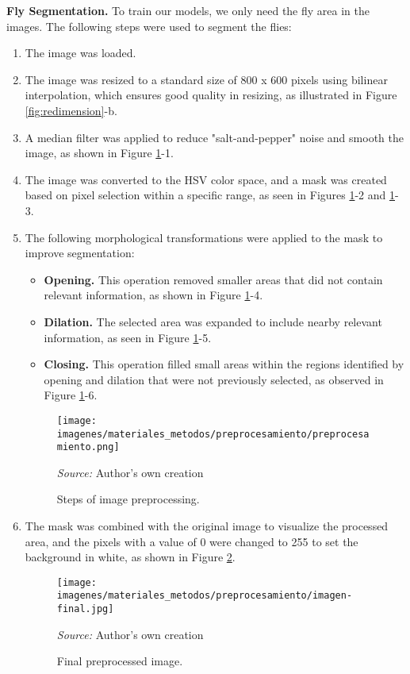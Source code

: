 \textbf{Fly Segmentation.}
To train our models, we only need the fly area in the images. The following steps were used to segment the flies:
\begin{enumerate}
	\item The image was loaded.
	\item The image was resized to a standard size of 800 x 600 pixels using bilinear interpolation, which ensures good quality in resizing, as illustrated in Figure \ref{fig:redimension}-b.
	\item A median filter was applied to reduce "salt-and-pepper" noise and smooth the image, as shown in Figure \ref{fig:preprocesamiento}-1.
	\item The image was converted to the HSV color space, and a mask was created based on pixel selection within a specific range, as seen in Figures \ref{fig:preprocesamiento}-2 and \ref{fig:preprocesamiento}-3.
	\item The following morphological transformations were applied to the mask to improve segmentation:
	\begin{itemize}
		\item \textbf{Opening.} This operation removed smaller areas that did not contain relevant information, as shown in Figure \ref{fig:preprocesamiento}-4.
		\item \textbf{Dilation.} The selected area was expanded to include nearby relevant information, as seen in Figure \ref{fig:preprocesamiento}-5.
		\item \textbf{Closing.} This operation filled small areas within the regions identified by opening and dilation that were not previously selected, as observed in Figure \ref{fig:preprocesamiento}-6.
	\end{itemize}
	\begin{figure}[htbp]
		\centering
		\texttt{[image: imagenes/materiales\_metodos/preprocesamiento/preprocesamiento.png]}
		\caption{Steps of image preprocessing.}
		\scriptsize \textit{Source:} Author's own creation
		\label{fig:preprocesamiento}
	\end{figure}
	\item The mask was combined with the original image to visualize the processed area, and the pixels with a value of 0 were changed to 255 to set the background in white, as shown in Figure \ref{fig:imagenfinal}.
	\begin{figure}[htbp]
		\centering
		\texttt{[image: imagenes/materiales\_metodos/preprocesamiento/imagen-final.jpg]}
		\caption{Final preprocessed image.}
		\scriptsize \textit{Source:} Author's own creation
		\label{fig:imagenfinal}
	\end{figure}
\end{enumerate}

